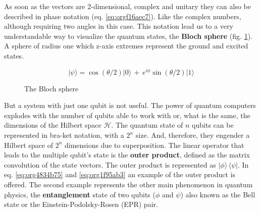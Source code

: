 \begin{itemize}
As soon as the vectors are 2-dimensional, complex and unitary they can also be described in phase notation (eq. \ref{eq:orgf16aec7}).
Like the complex numbers, although requiring two angles in this case.
This notation lead us to a very understandable way to visualize the quantum states, the \textbf{Bloch sphere} (fig. \ref{fig:bloch_sphere}).
A sphere of radius one which z-axis extremes represent the ground and excited states.

\begin{equation}
\label{eq:orgf16aec7}
|\psi \rangle =\cos \left(\theta /2\right)|0\rangle \,+\,e^{i\phi }\sin \left(\theta /2\right)|1\rangle
\end{equation}

\begin{figure}
\centering
{}
\caption{The Bloch sphere}
\label{fig:bloch_sphere}
\end{figure}

But a system with just one qubit is not useful.
The power of quantum computers explodes with the number of qubits able to work with or, what is the same, the dimensions of the Hilbert space \(\mathscr{H}\).
The quantum state of \(n\) qubits can be represented in bra-ket notation, with a \(2^n\) size.
And, therefore, they engender a Hilbert space of \(2^n\) dimensions due to superposition.
The linear operator that leads to the multiple qubit's state is the \textbf{outer product}, defined as the matrix convolution of the state vectors.
The outer product is represented as \(|\phi \rangle \,\langle \psi |\).
In eq. \ref{eq:org4834b75} and \ref{eq:org1f95ab3} an example of the outer product is offered.
The second example represents the other main phenomenon in quantum physics, the \textbf{entanglement} state of two qubits (\(\phi\) and \(\psi\)) also known as the Bell state or the Einstein-Podolsky-Rosen (EPR) pair.


\end{itemize}
